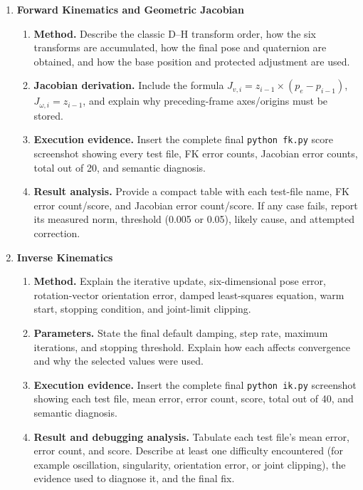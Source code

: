 \documentclass[11pt]{article}
\newcommand{\code}[1]{\nolinkurl{#1}}
\begin{document}
\begin{enumerate}[label=\textbf{\arabic*.},leftmargin=2em]
  \item \textbf{Forward Kinematics and Geometric Jacobian}
  \begin{enumerate}[label*=\arabic*.,leftmargin=2.4em]
    \item \textbf{Method.} Describe the classic D--H transform order, how the
      six transforms are accumulated, how the final pose and quaternion are
      obtained, and how the base position and protected adjustment are used.
    \item \textbf{Jacobian derivation.} Include the formula
      \(J_{v,i}=z_{i-1}\times(p_e-p_{i-1})\),
      \(J_{\omega,i}=z_{i-1}\), and explain why preceding-frame axes/origins
      must be stored.
    \item \textbf{Execution evidence.} Insert the complete final
      \code{python fk.py} score screenshot showing every test file, FK error
      counts, Jacobian error counts, total out of 20, and semantic diagnosis.
    \item \textbf{Result analysis.} Provide a compact table with each test-file
      name, FK error count/score, and Jacobian error count/score. If any case
      fails, report its measured norm, threshold (0.005 or 0.05), likely cause,
      and attempted correction.
  \end{enumerate}

  \item \textbf{Inverse Kinematics}
  \begin{enumerate}[label*=\arabic*.,leftmargin=2.4em]
    \item \textbf{Method.} Explain the iterative update, six-dimensional pose
      error, rotation-vector orientation error, damped least-squares equation,
      warm start, stopping condition, and joint-limit clipping.
    \item \textbf{Parameters.} State the final default damping, step rate,
      maximum iterations, and stopping threshold. Explain how each affects
      convergence and why the selected values were used.
    \item \textbf{Execution evidence.} Insert the complete final
      \code{python ik.py} screenshot showing each test file, mean error, error
      count, score, total out of 40, and semantic diagnosis.
    \item \textbf{Result and debugging analysis.} Tabulate each test file's
      mean error, error count, and score. Describe at least one difficulty
      encountered (for example oscillation, singularity, orientation error, or
      joint clipping), the evidence used to diagnose it, and the final fix.
  \end{enumerate}


\end{enumerate}
\end{document}
